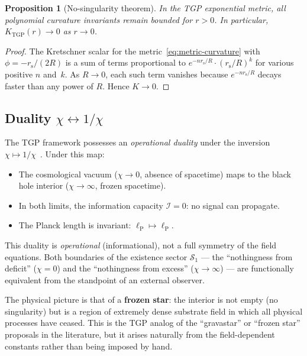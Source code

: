 \documentclass[11pt,a4paper]{article}
\newtheorem{proposition}[theorem]{Proposition}
\theoremstyle{definition}
\theoremstyle{remark}
\newcommand{\lP}{\ell_{\mathrm{P}}}
\newcommand{\rs}{r_{\mathrm{s}}}
\begin{document}
\begin{proposition}[No-singularity theorem]\label{prop:no-sing}
In the TGP exponential metric, all polynomial curvature invariants
remain bounded for $r > 0$.  In particular,
$K_{\mathrm{TGP}}(r) \to 0$ as $r \to 0$.
\end{proposition}

\begin{proof}
The Kretschner scalar for the metric~\eqref{eq:metric-curvature} with
$\phi = -\rs/(2R)$ is a sum of terms proportional to
$e^{-n\rs/R}\cdot(\rs/R)^k$ for various positive $n$ and~$k$.
As $R \to 0$, each such term vanishes because $e^{-n\rs/R}$ decays
faster than any power of $R$.  Hence $K \to 0$.
\end{proof}

\subsection{Duality $\chi \leftrightarrow 1/\chi$}

The TGP framework possesses an \emph{operational duality} under the
inversion $\chi \mapsto 1/\chi$~\cite{Serafin2026-full}.  Under this
map:
\begin{itemize}[nosep]
  \item The cosmological vacuum ($\chi \to 0$, absence of spacetime)
    maps to the black hole interior ($\chi \to \infty$, frozen
    spacetime).
  \item In both limits, the information capacity $\mathcal{I} = 0$:
    no signal can propagate.
  \item The Planck length is invariant: $\lP \mapsto \lP$.
\end{itemize}
This duality is \emph{operational} (informational), not a full symmetry
of the field equations.  Both boundaries of the existence sector
$\mathcal{S}_1$ --- the ``nothingness from deficit'' ($\chi = 0$) and
the ``nothingness from excess'' ($\chi \to \infty$) --- are
functionally equivalent from the standpoint of an external observer.

The physical picture is that of a \textbf{frozen star}: the interior is
not empty (no singularity) but is a region of extremely dense substrate
field in which all physical processes have ceased.  This is the TGP
analog of the ``gravastar'' or ``frozen star'' proposals in the
literature, but it arises naturally from the field-dependent constants
rather than being imposed by hand.

\end{document}
